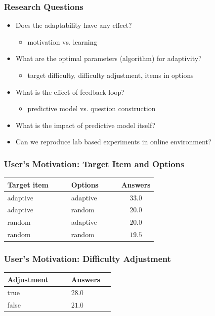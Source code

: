 \documentclass[xcolor=svgnames]{beamer}
\newcommand{\head}[1]{\textnormal{\textbf{#1}}}
\begin{document}
\begin{frame}
	\frametitle{Research Questions}
	\begin{itemize}
		\item<1-5> Does the adaptability have any effect?
			\begin{itemize}
				\item motivation vs. learning
			\end{itemize}
		\item<2-5> What are the optimal parameters (algorithm) for adaptivity?
			\begin{itemize}
				\item target difficulty, difficulty adjustment, items in options
			\end{itemize}
		\item<3-5> What is the effect of feedback loop?
			\begin{itemize}
				\item predictive model vs. question construction
			\end{itemize}
		\item<4-5> What is the impact of predictive model itself?
		\item<5> Can we reproduce lab based experiments in online environment?
	\end{itemize}
\end{frame}
\begin{frame}
	\frametitle{User's Motivation: Target Item and Options}
	\begin{center}
		\begin{tabular}{llc}
			\toprule
			\head{Target item~~~~} & \head{Options~~~~} & \head{Answers}\\
			\midrule
			adaptive	& adaptive & $33.0$\\
			adaptive	& random & $20.0$\\
			random & adaptive	& $20.0$ \\
			random & random & $19.5$\\
			\bottomrule
		\end{tabular}
	\end{center}
\end{frame}
\begin{frame}
	\frametitle{User's Motivation: Difficulty Adjustment}
	\begin{center}
		\begin{tabular}{llc}
			\toprule
			\head{Adjustment~~~~} & \head{Answers}\\
			\midrule
				true & $28.0$\\
				false & $21.0$\\
			\bottomrule
		\end{tabular}
	\end{center}
\end{frame}
\end{document}
